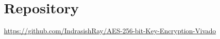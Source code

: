 \documentclass[11pt,a4paper]{article}
\begin{document}
\vspace{1em}
\begin{center}
\end{center}

\section*{Repository}
\vspace{-0.5em}
\begin{center}
\large\url{https://github.com/IndrasishRay/AES-256-bit-Key-Encryption-Vivado}
\end{center}
\end{document}

